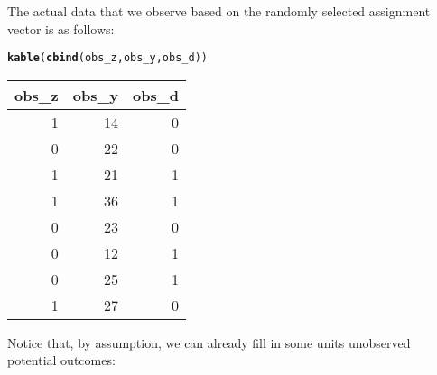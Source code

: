 \documentclass[11pt,leqno]{article}\usepackage[]{graphicx}\usepackage[]{color}
\makeatletter
\newcommand{\hlstd}[1]{\textcolor[rgb]{0.345,0.345,0.345}{#1}}%
\newcommand{\hlkwd}[1]{\textcolor[rgb]{0.737,0.353,0.396}{\textbf{#1}}}%
\newenvironment{kframe}{%
 \def\at@end@of@kframe{}%
 \ifinner\ifhmode%
  \def\at@end@of@kframe{\end{minipage}}%
  \begin{minipage}{\columnwidth}%
 \fi\fi%
 \def\FrameCommand##1{\hskip\@totalleftmargin \hskip-\fboxsep
 \colorbox{shadecolor}{##1}\hskip-\fboxsep
     \hskip-\linewidth \hskip-\@totalleftmargin \hskip\columnwidth}%
 \MakeFramed {\advance\hsize-\width
   \@totalleftmargin\z@ \linewidth\hsize
   \@setminipage}}%
 {\par\unskip\endMakeFramed%
 \at@end@of@kframe}
\newenvironment{knitrout}{}{} %
\theoremstyle{newstyle}
\makeatother
\begin{document}
The actual data that we observe based on the randomly selected assignment vector is as follows:

\begin{knitrout}\footnotesize
{}\color{fgcolor}\begin{kframe}
\begin{alltt}
\hlkwd{kable}\hlstd{(}\hlkwd{cbind}\hlstd{(obs_z, obs_y, obs_d))}
\end{alltt}
\end{kframe}
\begin{tabular}{r|r|r}
\hline
obs\_z & obs\_y & obs\_d\\
\hline
1 & 14 & 0\\
\hline
0 & 22 & 0\\
\hline
1 & 21 & 1\\
\hline
1 & 36 & 1\\
\hline
0 & 23 & 0\\
\hline
0 & 12 & 1\\
\hline
0 & 25 & 1\\
\hline
1 & 27 & 0\\
\hline
\end{tabular}


\end{knitrout}

Notice that, by assumption, we can already fill in some units unobserved potential outcomes:
\end{document}
